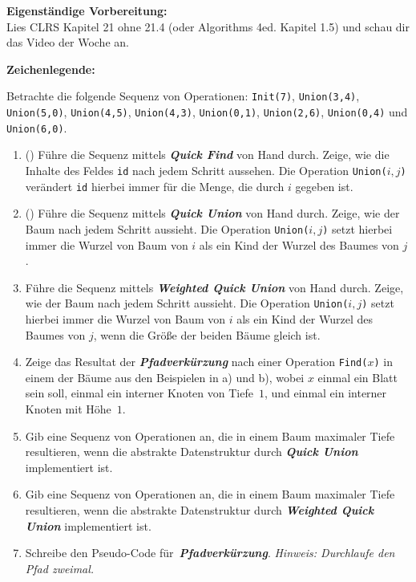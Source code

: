 \documentclass{uebung_cs}
\newcommand{\qfind}{\textit{\textbf{Quick Find}}}
\newcommand{\qunion}{\textit{\textbf{Quick Union}}}
\newcommand{\wqunion}{\textit{\textbf{Weighted Quick Union}}}
\newcommand{\pathcomp}{\textit{\textbf{Pfadverkürzung}}}
\begin{document}
\textbf{Eigenständige Vorbereitung:}\\
Lies  CLRS Kapitel 21 ohne 21.4 (oder Algorithms 4ed. Kapitel 1.5) und schau dir das  Video der Woche an.

\textbf{Zeichenlegende:}
\legende{}


\begin{aufgabe}\label{tue-first}
	Betrachte die folgende Sequenz von Operationen:
	\texttt{Init(7)}, \texttt{Union(3,4)}, \texttt{Union(5,0)}, \texttt{Union(4,5)}, \texttt{Union(4,3)}, \texttt{Union(0,1)}, \texttt{Union(2,6)}, \texttt{Union(0,4)} und \texttt{Union(6,0)}.
	\begin{enumerate}
		\item (\warmup) Führe die Sequenz mittels \qfind{} von Hand durch.
		Zeige, wie die Inhalte des Feldes \texttt{id} nach jedem Schritt aussehen.
		Die Operation \texttt{Union($i,j$)} verändert \texttt{id} hierbei immer für die Menge, die durch $i$ gegeben ist.
		\item (\warmup) Führe die Sequenz mittels \qunion{} von Hand durch.
		Zeige, wie der Baum nach jedem Schritt aussieht.
		Die Operation \texttt{Union($i,j$)} setzt hierbei immer die Wurzel von Baum von $i$ als ein Kind der Wurzel des Baumes von $j$.
		\item Führe die Sequenz mittels \wqunion{} von Hand durch.
		Zeige, wie der Baum nach jedem Schritt aussieht.
		Die Operation \texttt{Union($i,j$)} setzt hierbei immer die Wurzel von Baum von $i$ als ein Kind der Wurzel des Baumes von $j$, wenn die Größe der beiden Bäume gleich ist.
		\item Zeige das Resultat der \pathcomp{} nach einer Operation \texttt{Find($x$)} in einem der Bäume aus den Beispielen in a) und b), wobei $x$ einmal ein Blatt sein soll, einmal ein interner Knoten von Tiefe~$1$, und einmal ein interner Knoten mit Höhe~$1$.
		\item Gib eine Sequenz von Operationen an, die in einem Baum maximaler Tiefe resultieren, wenn die abstrakte Datenstruktur durch \qunion{} implementiert ist.
		\item Gib eine Sequenz von Operationen an, die in einem Baum maximaler Tiefe resultieren, wenn die abstrakte Datenstruktur durch \wqunion{} implementiert ist.
		\item Schreibe den Pseudo-Code für~\pathcomp{}. \emph{Hinweis: Durchlaufe den Pfad zweimal.}
	\end{enumerate}
\end{aufgabe}
\end{document}
